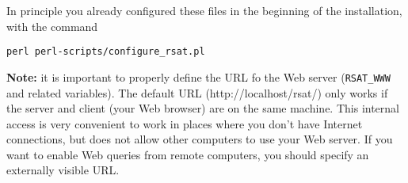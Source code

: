 \begin{enumerate}
  In principle you already configured these files in the beginning of
  the installation, with the command
  \begin{lstlisting}
perl perl-scripts/configure_rsat.pl
  \end{lstlisting}

  \textbf{Note:} it is important to properly define the URL fo the Web
  server (\texttt{RSAT\_WWW} and related variables). The default URL
  (http://localhost/rsat/) only works if the server and client (your
  Web browser) are on the same machine. This internal access is very
  convenient to work in places where you don't have Internet
  connections, but does not allow other computers to use your Web
  server.  If you want to enable Web queries from remote computers,
  you should specify an externally visible URL.

\end{enumerate}

